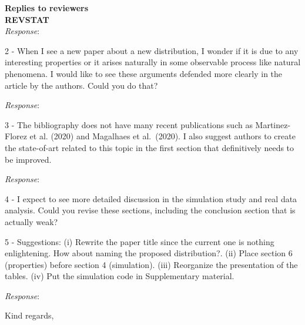 \documentclass[version=last,12pt,{"/home/prdm0/R/x86_64-pc-linux-gnu-library/4.2/komaletter/rmarkdown/templates/pdf/resources/maintainersDelight"},letterpaper,]{scrlttr2}
\begin{document}
\begin{letter}{\textbf{Replies to reviewers}\\\textbf{REVSTAT}\\}
\emph{Response}:

2 - When I see a new paper about a new distribution, I wonder if it is
due to any interesting properties or it arises naturally in some
observable process like natural phenomena. I would like to see these
arguments defended more clearly in the article by the authors. Could you
do that?

\emph{Response}:

3 - The bibliography does not have many recent publications such as
Martinez-Florez et al. (2020) and Magalhaes et al.~(2020). I also
suggest authors to create the state-of-art related to this topic in the
first section that definitively needs to be improved.

\emph{Response}:

4 - I expect to see more detailed discussion in the simulation study and
real data analysis. Could you revise these sections, including the
conclusion section that is actually weak?

5 - Suggestions: (i) Rewrite the paper title since the current one is
nothing enlightening. How about naming the proposed distribution?. (ii)
Place section 6 (properties) before section 4 (simulation). (iii)
Reorganize the presentation of the tables. (iv) Put the simulation code
in Supplementary material.

\emph{Response}:

\closing{Kind regards,}




\end{letter}
\end{document}
